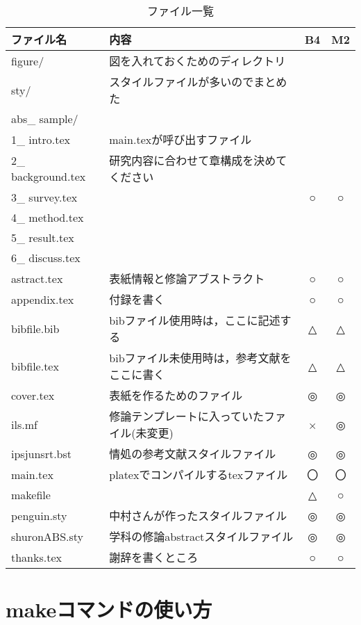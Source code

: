 \begin{table}[htb]
\begin{center}
\caption{ファイル一覧}
\label{tb:filelist}
{\tabcolsep=0.3cm
\begin{tabular}{l|l|c|c}
\hline\hline
ファイル名 & 内容 & B4 & M2 \\ \hline
figure/     & 図を入れておくためのディレクトリ  & & \\ \hline
sty/        & スタイルファイルが多いのでまとめた & & \\ \hline
abs\_ sample/ & & & \\  \hline
1\_ intro.tex & main.texが呼び出すファイル& & \\  
2\_ background.tex & 研究内容に合わせて章構成を決めてください& & \\ 
3\_ survey.tex & &○&○\\ 
4\_ method.tex & & & \\ 
5\_ result.tex & & & \\ 
6\_ discuss.tex & & & \\ \hline
astract.tex & 表紙情報と修論アブストラクト&○&○\\ \hline
appendix.tex & 付録を書く&○&○\\ \hline
bibfile.bib & bibファイル使用時は，ここに記述する &△&△\\ \hline
bibfile.tex & bibファイル未使用時は，参考文献をここに書く &△&△\\ \hline
cover.tex   & 表紙を作るためのファイル &◎&◎\\ \hline
ils.mf & 修論テンプレートに入っていたファイル(未変更)  &×&◎\\ \hline
ipsjunsrt.bst & 情処の参考文献スタイルファイル &◎&◎\\ \hline
main.tex  & platexでコンパイルするtexファイル &〇&〇\\ \hline
makefile    & &△&○\\ \hline
penguin.sty &中村さんが作ったスタイルファイル &◎&◎\\ \hline
shuronABS.sty &学科の修論abstractスタイルファイル&◎&◎\\ \hline
thanks.tex    & 謝辞を書くところ &○&○\\ \hline
\end{tabular}}
\end{center}
\end{table}



\section{makeコマンドの使い方}

